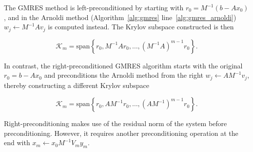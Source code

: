 The GMRES method is left-preconditioned by starting with $r_0 = M^{-1}(b-Ax_0)$, and in the Arnoldi method (Algorithm~\ref{alg:gmres} line~\ref{alg:gmres_arnoldi}) $w_j \gets M^{-1}Av_j$ is computed instead. The Krylov subspace constructed is then

\begin{equation}
    \mathcal{K}_m = \text{span}\left\{r_0, M^{-1}Ar_0, \ldots, \left(M^{-1}A\right)^{m-1}r_0\right\}.
\end{equation}

In contrast, the right-preconditioned GMRES algorithm starts with the original $r_0 = b - Ax_0$ and preconditions the Arnoldi method from the right $w_j \gets AM^{-1}v_j$, thereby constructing a different Krylov subspace

\begin{equation}
    \mathcal{K}_m = \text{span}\left\{r_0, AM^{-1}r_0, \ldots, \left(AM^{-1}\right)^{m-1}r_0\right\}.
\end{equation}

Right-preconditioning makes use of the residual norm of the system before preconditioning. However, it requires another preconditioning operation at the end with $x_m \gets x_0 M^{-1}V_m y_m$.

